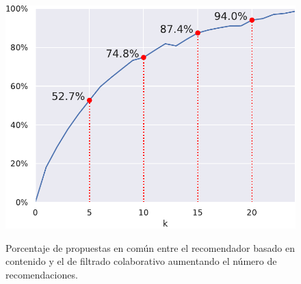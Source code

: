 \begin{figure}
    \centering
    \caption[Porcentaje de propuestas en común entre los dos recomendadores base.]{Porcentaje de propuestas en común entre el recomendador basado en contenido y el de filtrado colaborativo aumentando el número de recomendaciones.}
    \includegraphics[width=.4\linewidth]{figures/04_implementacion/12_hybrid_common_Decentraland_W-THU_normalize=True.pdf}
    \label{fig:hybrid-common-proposals}
\end{figure}
